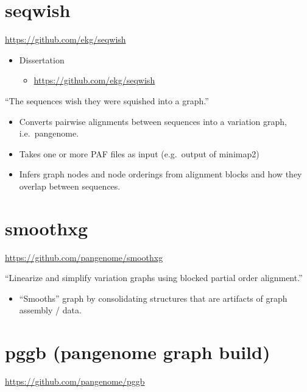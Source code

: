 \documentclass[
]{book}
\providecommand{\tightlist}{%
  \setlength{\itemsep}{0pt}\setlength{\parskip}{0pt}}
\begin{document}
\hypertarget{seqwish}{%
\section{seqwish}\label{seqwish}}

\url{https://github.com/ekg/seqwish}

\begin{itemize}
\tightlist
\item
  Dissertation

  \begin{itemize}
  \tightlist
  \item
    \url{https://github.com/ekg/seqwish}
  \end{itemize}
\end{itemize}

``The sequences wish they were squished into a graph.''

\begin{itemize}
\item
  Converts pairwise alignments between sequences into a variation graph, i.e.~pangenome.
\item
  Takes one or more PAF files as input (e.g.~output of minimap2)
\item
  Infers graph nodes and node orderings from alignment blocks
  and how they overlap between sequences.
\end{itemize}

\hypertarget{smoothxg}{%
\section{smoothxg}\label{smoothxg}}

\url{https://github.com/pangenome/smoothxg}

``Linearize and simplify variation graphs using blocked partial order alignment.''

\begin{itemize}
\tightlist
\item
  ``Smooths'' graph by consolidating structures that are artifacts of graph assembly / data.
\end{itemize}

\hypertarget{pggb-pangenome-graph-build}{%
\section{pggb (pangenome graph build)}\label{pggb-pangenome-graph-build}}

\url{https://github.com/pangenome/pggb}
\end{document}
